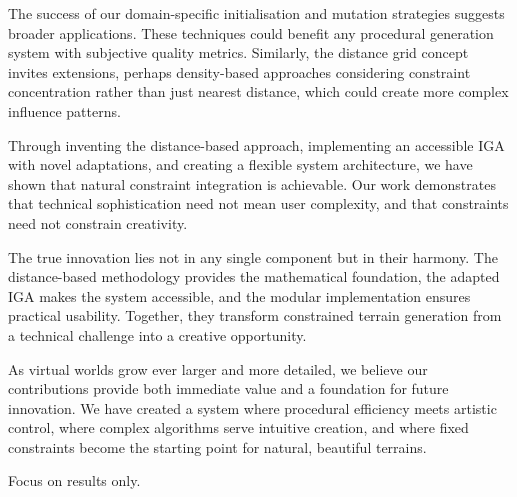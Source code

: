 The success of our domain-specific initialisation and mutation strategies suggests broader applications. These techniques could benefit any procedural generation system with subjective quality metrics. Similarly, the distance grid concept invites extensions, perhaps density-based approaches considering constraint concentration rather than just nearest distance, which could create more complex influence patterns.

Through inventing the distance-based approach, implementing an accessible IGA with novel adaptations, and creating a flexible system architecture, we have shown that natural constraint integration is achievable. Our work demonstrates that technical sophistication need not mean user complexity, and that constraints need not constrain creativity.

The true innovation lies not in any single component but in their harmony. The distance-based methodology provides the mathematical foundation, the adapted IGA makes the system accessible, and the modular implementation ensures practical usability. Together, they transform constrained terrain generation from a technical challenge into a creative opportunity.

As virtual worlds grow ever larger and more detailed, we believe our contributions provide both immediate value and a foundation for future innovation. We have created a system where procedural efficiency meets artistic control, where complex algorithms serve intuitive creation, and where fixed constraints become the starting point for natural, beautiful terrains.


Focus on results only. 